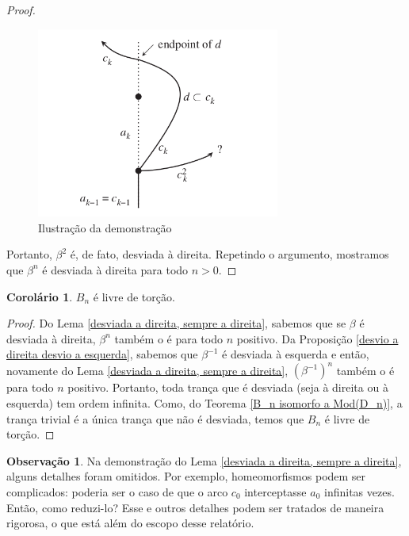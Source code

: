 \documentclass[a4paper,portuguese,11pt,twoside, leqno]{book}
\theoremstyle{definition}
\newtheorem{corollary}{Corolário}[theorem]
\newtheorem{remark}{Observação}[section]
\begin{document}
\begin{proof}
		\begin{figure}[H]
			\begin{center}
				\includegraphics[width=8cm]{Images/demosntracao_lema.png}
			\end{center}\caption{Ilustração da demonstração}
			\label{ilustracao da demonstracao}
		\end{figure}
		\par\vspace{0.3cm} Portanto, $\beta^2$ é, de fato, desviada à direita. Repetindo o argumento, mostramos que $\beta^n$ é desviada à direita para todo $n>0$.
	\end{proof}
	
	\begin{corollary}
		\label{B_n livre de torcao por diagramas de curva}
		$B_n$ é livre de torção.
	\end{corollary}
	\begin{proof}
		Do Lema \eqref{desviada a direita, sempre a direita}, sabemos que se $\beta$ é desviada à direita, $\beta^n$ também o é para todo $n$ positivo. Da Proposição \eqref{desvio a direita desvio a esquerda}, sabemos que $\beta^{-1}$ é desviada à esquerda e então, novamente do Lema \eqref{desviada a direita, sempre a direita}, $(\beta^{-1})^n$ também o é para todo $n$ positivo. Portanto, toda trança que é desviada (seja à direita ou à esquerda) tem ordem infinita. Como, do Teorema \eqref{B_n isomorfo a Mod(D_n)}, a trança trivial é a única trança que não é desviada, temos que $B_n$ é livre de torção.
	\end{proof}
	
	\begin{remark}
		Na demonstração do Lema \eqref{desviada a direita, sempre a direita}, alguns detalhes foram omitidos. Por exemplo, homeomorfismos podem ser complicados: poderia ser o caso de que o arco $c_0$ interceptasse $a_0$ infinitas vezes. Então, como reduzi-lo? Esse e outros detalhes podem ser tratados de maneira rigorosa, o que está além do escopo desse relatório.
	\end{remark}
	
\end{document}
